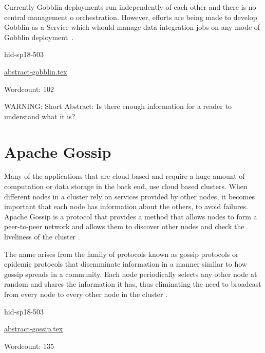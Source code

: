 Currently Gobblin deployments run independently of each other and
there is no central management o orchestration. However, efforts are
being made to develop Gobblin-as-a-Service which whould manage data
integration jobs on any mode of Gobblin 
deployment~\cite{hid-sp18-503-www-gobblin-docs}.


\begin{IU}

hid-sp18-503

\href{https://github.com/cloudmesh-community/hid-sp18-503/blob/master//technology/abstract-gobblin.tex}{abstract-gobblin.tex}

 

Wordcount: 102

WARNING: Short Abstract: Is there enough information for a reader to understand what it is?

\end{IU}

\section{Apache Gossip}

Many of the applications that are cloud based and require a huge amount of
computation or data storage in the back end, use cloud based clusters. When
different nodes in a cluster rely on services provided by other nodes, it
becomes important that each node has information about the others, to avoid
failures. Apache Gossip is a protocol that provides a method that allows
nodes to form a peer-to-peer network and allows them to discover other
nodes and check the liveliness of the cluster
\cite{hid-sp18-503-www-gossip}.

The name arises from the family of protocols known as gossip protocols or
epidemic protocols that disemminate information in a manner similar to how
gossip spreads in a community. Each node periodically selects any other
node at random and shares the information it has, thus eliminating the need
to broadcast from every node to every other node in the cluster
\cite{hid-sp18-503-www-gossip-wiki}.


\begin{IU}

hid-sp18-503

\href{https://github.com/cloudmesh-community/hid-sp18-503/blob/master//technology/abstract-gossip.tex}{abstract-gossip.tex}

 

Wordcount: 135

\end{IU}


